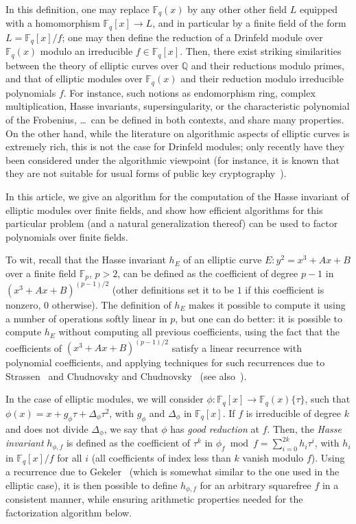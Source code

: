 \documentclass[12pt]{article}
\theoremstyle{plain}
\theoremstyle{definition}
\newcommand{\ang}[1]{\{#1\}}
\def\Q{\ensuremath{\mathbb{Q}}}
\def\F{\ensuremath{\mathbb{F}}}
\begin{document}
In this definition, one may replace $\F_q(x)$ by any other other field
$L$ equipped with a homomorphism $\F_q[x]\to L$, and in particular by
a finite field of the form $L=\F_q[x]/f$; one may then define the {\rm
  reduction} of a Drinfeld module over $\F_q(x)$ modulo an irreducible
$f \in \F_q[x]$. Then, there exist striking similarities between the
theory of elliptic curves over $\Q$ and their reductions modulo
primes, and that of elliptic modules over $\F_q(x)$ and their
reduction modulo irreducible polynomials $f$. For instance, such
notions as endomorphism ring, complex multiplication, Hasse
invariants, supersingularity, or the characteristic polynomial of the
Frobenius, \dots~can be defined in both contexts, and share many
properties. On the other hand, while the literature on algorithmic
aspects of elliptic curves is extremely rich, this is not the case for
Drinfeld modules; only recently have they been considered under the
algorithmic viewpoint (for instance, it is known that they are not
suitable for usual forms of public key cryptography~\cite{Scanlon01}).

In this article, we give an algorithm for the computation of the Hasse
invariant of elliptic modules over finite fields, and show how efficient
algorithms for this particular problem (and a natural generalization
thereof) can be used to factor polynomials over finite fields.

To wit, recall that the Hasse invariant $h_E$ of an elliptic curve $E:
y^2=x^3+Ax+B$ over a finite field $\F_p$, $p>2$, can be defined as the
coefficient of degree $p-1$ in $(x^3+Ax+B)^{(p-1)/2}$ (other
definitions set it to be $1$ if this coefficient is nonzero, $0$
otherwise). The definition of $h_E$ makes it possible to compute it
using a number of operations softly linear in $p$, but one can do
better: it is possible to compute $h_E$ without computing all previous
coefficients, using the fact that the coefficients of 
$(x^3+Ax+B)^{(p-1)/2}$ satisfy a linear recurrence with polynomial
coefficients, and applying techniques for such recurrences due to
Strassen~\cite{Strassen76} and Chudnovsky and
Chudnovsky~\cite{ChCh88} (see also~\cite{BoGaSc07}).

In the case of elliptic modules, we will consider $\phi: \F_q[x] \to
\F_q(x)\ang{\tau}$, such that $\phi(x)=x+ g_\phi \tau+\Delta_\phi
\tau^2$, with $g_\phi$ and $\Delta_\phi$ in $\F_q[x]$. If $f$ is
irreducible of degree $k$ and does not divide $\Delta_\phi$,
we say that $\phi$ has {\em good reduction} at $f$. Then, the {\em
  Hasse invariant} $h_{\phi,f}$ is defined as the coefficient of
$\tau^k$ in $\phi_f\bmod f =\sum_{i=0}^{2k} h_i \tau^i$, with $h_i$
in $\F_q[x]/f$ for all $i$ (all coefficients of index less than $k$
vanish modulo $f$).  Using a recurrence due to Gekeler~\cite{gek}
(which is somewhat similar to the one used in the elliptic case), it
is then possible to define $h_{\phi,f}$ for an arbitrary squarefree
$f$ in a consistent manner, while ensuring arithmetic properties
needed for the factorization algorithm below.
\end{document}
